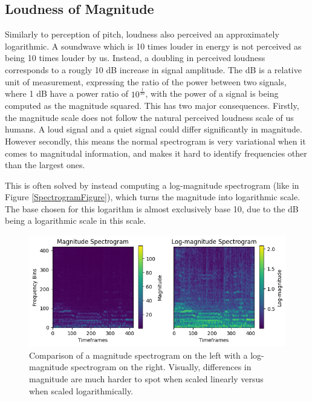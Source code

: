 \subsection{Loudness of Magnitude}

Similarly to perception of pitch, loudness also perceived an approximately logarithmic. A soundwave which is 10 times louder in energy is not perceived as being 10 times louder by us. Instead, a doubling in perceived loudness corresponds to a rougly 10 \gls{dB} increase in signal amplitude. The \acrlong{dB} is a relative unit of measurement, expressing the ratio of the power between two signals, where 1 \gls{dB} have a power ratio of $10^\frac{1}{10}$, with the power of a signal is being computed as the magnitude squared. This has two major consequences. Firstly, the magnitude scale does not follow the natural perceived loudness scale of us humans. A loud signal and a quiet signal could differ significantly in magnitude. However secondly, this means the normal spectrogram is very variational when it comes to magnitudal information, and makes it hard to identify frequencies other than the largest ones.

This is often solved by instead computing a log-magnitude spectrogram (like in Figure \ref{SpectrogramFigure}), which turns the magnitude into logarithmic scale. The base chosen for this logarithm is almost exclusively base 10, due to the \acrlong{dB} being a logarithmic scale in this scale.

\begin{figure}[H]
    \centering
    \hspace*{-1.0cm}
    \includegraphics[scale=1.0]{figures/spectrogramlogspectrogram}
    \caption{Comparison of a magnitude spectrogram on the left with a log-magnitude spectrogram on the right. Visually, differences in magnitude are much harder to spot when scaled linearly versus when scaled logarithmically.}
    \label{SpectrogramLogspectrogramFigure}
\end{figure}

